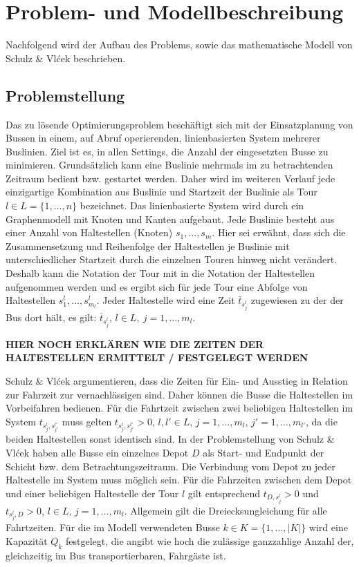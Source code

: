 \chapter{Problem- und Modellbeschreibung}
\label{chapter:3}

Nachfolgend wird der Aufbau des Problems, sowie das mathematische Modell von Schulz \& Vlćek beschrieben. 
\section{Problemstellung}
\label{sec:3.1}
\label{sec:Problemstellung}
Das zu lösende Optimierungsproblem beschäftigt sich mit der Einsatzplanung von Bussen in einem, auf Abruf operierenden, linienbasierten System mehrerer Buslinien. Ziel ist es, in allen Settings, die Anzahl der eingesetzten Busse zu minimieren.
Grundsätzlich kann eine Buslinie mehrmals im zu betrachtenden Zeitraum bedient bzw. gestartet werden. 
Daher wird im weiteren Verlauf jede einzigartige Kombination aus Buslinie und Startzeit der Buslinie als Tour \( l \in L = \{1,  \dots , n\} \) bezeichnet. 
Das linienbasierte System wird durch ein Graphenmodell mit Knoten und Kanten aufgebaut. Jede Buslinie besteht aus einer Anzahl von Haltestellen (Knoten) $s_1, \dots, s_{m}$. Hier sei erwähnt, dass sich die Zusammensetzung und Reihenfolge der Haltestellen je Buslinie mit unterschiedlicher Startzeit durch die einzelnen Touren hinweg nicht verändert. Deshalb kann die Notation der Tour mit in die Notation der Haltestellen aufgenommen werden und es ergibt sich für jede Tour eine Abfolge von Haltestellen $s^l_1,  \dots , s^l_{m_l}$.
Jeder Haltestelle wird eine Zeit $\bar{t}_{s^l_j}$ zugewiesen zu der der Bus dort hält, es gilt: $\bar{t}_{s^l_j}$, $l \in L,\ j = 1, \dots, m_l$.


\textbf{HIER NOCH ERKLÄREN WIE DIE ZEITEN DER HALTESTELLEN ERMITTELT / FESTGELEGT WERDEN}


Schulz \& Vlćek argumentieren, dass die Zeiten für Ein- und Ausstieg in Relation zur Fahrzeit zur vernachlässigen sind. Daher können die Busse die Haltestellen im Vorbeifahren bedienen.
Für die Fahrtzeit zwischen zwei beliebigen Haltestellen im System $t_{s^l_j, s^{l'}_{j'}}$ muss gelten $t_{s^l_j, s^{l'}_{j'}}> 0$, $l, l' \in L$, $j = 1, \dots, m_l$, $j' = 1, \dots, m_{l'}$, da die beiden Haltestellen sonst identisch sind.
In der Problemstellung von Schulz \& Vlćek haben alle Busse ein einzelnes Depot $D$ als Start- und Endpunkt der Schicht bzw. dem Betrachtungszeitraum. Die Verbindung vom Depot zu jeder Haltestelle im System muss möglich sein. Für die Fahrzeiten zwischen dem Depot und einer beliebigen Haltestelle der Tour $l$ gilt entsprechend $t_{D, s^l_j} > 0$ und $t_{s^l_j, D} > 0$, $l \in L$, $j = 1, \dots, m_l$. Allgemein gilt die Dreiecksungleichung für alle Fahrtzeiten.
Für die im Modell verwendeten Busse $k \in K = \{1, \dots, |K|\}$ wird eine Kapazität $Q_k$ festgelegt, die angibt wie hoch die zulässige ganzzahlige Anzahl der, gleichzeitig im Bus transportierbaren, Fahrgäste ist.

